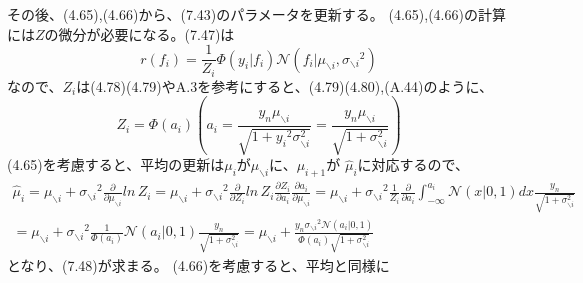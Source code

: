 \documentclass{jsarticle}
\begin{document}
その後、(4.65),(4.66)から、(7.43)のパラメータを更新する。
(4.65),(4.66)の計算には$Z$の微分が必要になる。(7.47)は
\begin{equation}
r(f_i) = \frac{1}{Z_i}\Phi(y_i | f_i)\mathcal{N}(f_i | \mu_{\backslash i}, {\sigma_{\backslash i}}^2)
\end{equation}
なので、$Z_i$は(4.78)(4.79)やA.3を参考にすると、(4.79)(4.80),(A.44)のように、
\begin{equation}
{Z_i} = \Phi(a_i) (a_i = \frac{y_n \mu_{\backslash i}}{\sqrt{1 + {y_i}^2 \sigma_{\backslash i}^2}}
= \frac{y_n \mu_{\backslash i}}{\sqrt{1 + \sigma_{\backslash i}^2}})
\end{equation}
(4.65)を考慮すると、平均の更新は$\mu_i$が$\mu_{\backslash i}$に、$\mu_{i+1}$が
$\hat{\mu}_i$に対応するので、
\begin{equation}
\begin{split}
\hat{\mu}_i = \mu_{\backslash i} + {\sigma_{\backslash i}}^2 \frac{\partial}{\partial \mu_{\backslash i}} ln \, Z_i
= \mu_{\backslash i} + {\sigma_{\backslash i}}^2 \frac{\partial}{\partial Z_i} ln \, Z_i \frac{\partial Z_i}{\partial a_i}\frac{\partial a_i}{\partial \mu_{\backslash i}}
= \mu_{\backslash i} + {\sigma_{\backslash i}}^2 \frac{1}{Z_i} \frac{\partial}{\partial a_i}\int_{-\infty}^{a_i} \mathcal{N}(x | 0, 1)dx \frac{y_n}{\sqrt{1 + \sigma_{\backslash i}^2}}\\
= \mu_{\backslash i} + {\sigma_{\backslash i}}^2 \frac{1}{\Phi(a_i)} \mathcal{N}(a_i | 0, 1) \frac{y_n}{\sqrt{1 + \sigma_{\backslash i}^2}}
= \mu_{\backslash i} + \frac{y_n {\sigma_{\backslash i}}^2  \mathcal{N}(a_i | 0, 1)}{\Phi(a_i)\sqrt{1 + \sigma_{\backslash i}^2}}
\end{split}
\end{equation}
となり、(7.48)が求まる。
(4.66)を考慮すると、平均と同様に
\end{document}
